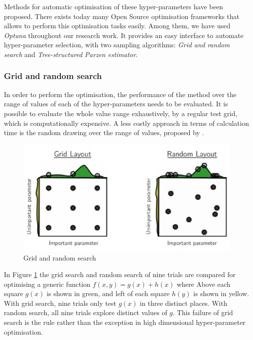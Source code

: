 Methods for automatic optimisation of these hyper-parameters have been proposed. There exists today many Open Source optimisation frameworks that allows to perform this optimisation tasks easily. Among them, we have used \textit{Optuna} \citep{optuna_2019} throughout our research work. It provides an easy interface to automate hyper-parameter selection, with two sampling algorithms: \textit{Grid and random search} and \textit{Tree-structured Parzen estimator}.


\subsubsection{Grid and random search} \label{Grid and Random search}

In order to perform the optimisation, the performance of the method over the range of values of each of the hyper-parameters needs to be evaluated. It is possible to evaluate the whole value range exhaustively, by a regular test grid, which is computationally expensive. A less costly approach in terms of calculation time is the random drawing over the range of values, proposed by \citep{bergstra2012random}. 
\begin{figure}
\centerline{\includegraphics[scale=0.7]{images/chapter_2/random_search.eps}}
\caption{Grid and random search \citep[from][]{bergstra2012random}}
\label{fig:Grid and Random Search}
\end{figure}
In Figure \ref{fig:Grid and Random Search} the grid search and random search of nine trials are compared for optimising a generic function $f(x, y) = g(x) + h(x)$ where Above each square $g(x)$ is shown in green, and left of each square $h(y)$ is shown in yellow. With grid search, nine trials only test $g(x)$ in three distinct places. With random search, all nine trials explore distinct values of $g$. This failure of grid search is the rule rather than the exception in high dimensional hyper-parameter optimisation.


